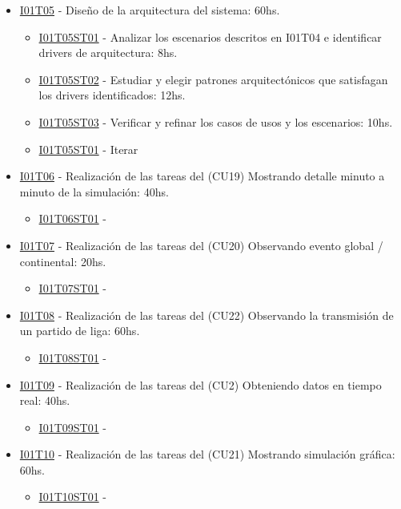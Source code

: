 \begin{itemize}
  
\item \underline{I01T05} - Diseño de la arquitectura del sistema: 60hs.
  \begin{itemize}
    \item \underline{I01T05ST01} - Analizar los escenarios descritos en I01T04 e identificar drivers de arquitectura: 8hs. 
    \item \underline{I01T05ST02} - Estudiar y elegir patrones arquitectónicos que satisfagan los drivers identificados: 12hs.
    \item \underline{I01T05ST03} - Verificar y refinar los casos de usos y los escenarios: 10hs.
    \item \underline{I01T05ST01} - Iterar
   \end{itemize}

\item \underline{I01T06} - Realización de las tareas del (CU19) Mostrando detalle minuto a minuto de la simulación: 40hs.
  \begin{itemize}
    \item \underline{I01T06ST01} - 
  \end{itemize}
    
\item \underline{I01T07} - Realización de las tareas del (CU20) Observando evento global / continental: 20hs.
  \begin{itemize}
    \item \underline{I01T07ST01} - 
  \end{itemize}
  
\item \underline{I01T08} - Realización de las tareas del (CU22) Observando la transmisión de un partido de liga: 60hs.
  \begin{itemize}
    \item \underline{I01T08ST01} - 
  \end{itemize}

\item \underline{I01T09} - Realización de las tareas del (CU2)  Obteniendo datos en tiempo real: 40hs.
  \begin{itemize}
    \item \underline{I01T09ST01} - 
  \end{itemize}
  
\item \underline{I01T10} - Realización de las tareas del (CU21) Mostrando simulación gráfica: 60hs.
  \begin{itemize}
    \item \underline{I01T10ST01} - 
  \end{itemize}
  
\end{itemize}
